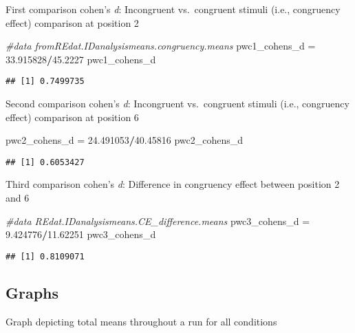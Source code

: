 \documentclass[
]{article}
\newenvironment{Shaded}{\begin{snugshade}}{\end{snugshade}}
\newcommand{\CommentTok}[1]{\textcolor[rgb]{0.56,0.35,0.01}{\textit{#1}}}
\newcommand{\FloatTok}[1]{\textcolor[rgb]{0.00,0.00,0.81}{#1}}
\newcommand{\NormalTok}[1]{#1}
\newcommand{\OperatorTok}[1]{\textcolor[rgb]{0.81,0.36,0.00}{\textbf{#1}}}
\newcommand{\StringTok}[1]{\textcolor[rgb]{0.31,0.60,0.02}{#1}}
\begin{document}
First comparison cohen's \emph{d}: Incongruent vs.~congruent stimuli
(i.e., congruency effect) comparison at position 2

\begin{Shaded}
\begin{Highlighting}[]
\CommentTok{#data fromREdat.IDanalysismeans.congruency.means}
\NormalTok{pwc1_cohens_d =}\StringTok{ }\FloatTok{33.915828}\OperatorTok{/}\FloatTok{45.2227}
\NormalTok{pwc1_cohens_d}
\end{Highlighting}
\end{Shaded}

\begin{verbatim}
## [1] 0.7499735
\end{verbatim}

Second comparison cohen's \emph{d}: Incongruent vs.~congruent stimuli
(i.e., congruency effect) comparison at position 6

\begin{Shaded}
\begin{Highlighting}[]
\NormalTok{pwc2_cohens_d =}\StringTok{ }\FloatTok{24.491053}\OperatorTok{/}\FloatTok{40.45816}
\NormalTok{pwc2_cohens_d}
\end{Highlighting}
\end{Shaded}

\begin{verbatim}
## [1] 0.6053427
\end{verbatim}

Third comparison cohen's \emph{d}: Difference in congruency effect
between position 2 and 6

\begin{Shaded}
\begin{Highlighting}[]
\CommentTok{#data REdat.IDanalysismeans.CE_difference.means}
\NormalTok{pwc3_cohens_d =}\StringTok{ }\FloatTok{9.424776}\OperatorTok{/}\FloatTok{11.62251}
\NormalTok{pwc3_cohens_d}
\end{Highlighting}
\end{Shaded}

\begin{verbatim}
## [1] 0.8109071
\end{verbatim}

\hypertarget{graphs}{%
\subsection{Graphs}\label{graphs}}

Graph depicting total means throughout a run for all conditions
\end{document}
